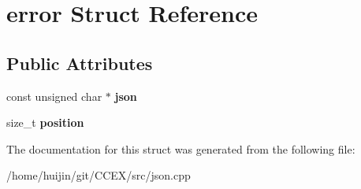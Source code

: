 \hypertarget{structerror}{\section{error Struct Reference}
\label{structerror}
}
\subsection*{Public Attributes}
\begin{DoxyCompactItemize}
\item 
\hypertarget{structerror_a9b123855d5dd48e86de846588462b39f}{const unsigned char $\ast$ {\bfseries json}}\label{structerror_a9b123855d5dd48e86de846588462b39f}

\item 
\hypertarget{structerror_a24de70a4d517ab351d80c18582cadb66}{size\-\_\-t {\bfseries position}}\label{structerror_a24de70a4d517ab351d80c18582cadb66}

\end{DoxyCompactItemize}


The documentation for this struct was generated from the following file\-:\begin{DoxyCompactItemize}
\item 
/home/huijin/git/\-C\-C\-E\-X/src/json.\-cpp\end{DoxyCompactItemize}
